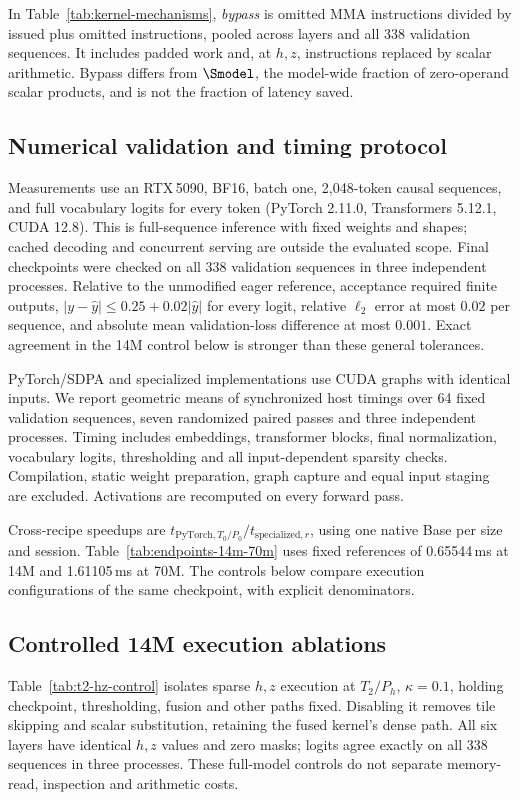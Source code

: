 In Table~\ref{tab:kernel-mechanisms}, \emph{bypass} is omitted MMA instructions divided by issued plus omitted instructions, pooled across layers and all 338 validation sequences. It includes padded work and, at $h,z$, instructions replaced by scalar arithmetic. Bypass differs from $\Smodel$, the model-wide fraction of zero-operand scalar products, and is not the fraction of latency saved.

\subsection{Numerical validation and timing protocol}
Measurements use an RTX\,5090, BF16, batch one, 2,048-token causal sequences,
and full vocabulary logits for every token (PyTorch 2.11.0, Transformers 5.12.1,
CUDA 12.8). This is full-sequence inference with fixed weights and shapes;
cached decoding and concurrent serving are outside the evaluated scope.
Final checkpoints were checked on all 338 validation sequences in three
independent processes. Relative to the unmodified eager reference, acceptance
required finite outputs, $|y-\hat y|\leq0.25+0.02|\hat y|$ for every logit,
relative $\ell_2$ error at most $0.02$ per sequence, and absolute mean
validation-loss difference at most $0.001$. Exact agreement in the 14M control
below is stronger than these general tolerances.

PyTorch/SDPA and specialized implementations use CUDA graphs with identical
inputs. We report geometric means of synchronized host timings over 64 fixed
validation sequences, seven randomized paired passes and three independent
processes. Timing includes embeddings, transformer blocks, final normalization,
vocabulary logits, thresholding and all input-dependent sparsity checks.
Compilation, static weight preparation, graph capture and equal input staging
are excluded. Activations are recomputed on every forward pass.

Cross-recipe speedups are $t_{\mathrm{PyTorch},T_0/P_0}/t_{\mathrm{specialized},r}$, using one native Base per size and session. Table~\ref{tab:endpoints-14m-70m} uses fixed references of 0.65544\,ms at 14M and 1.61105\,ms at 70M. The controls below compare execution configurations of the same checkpoint, with explicit denominators.

\subsection{Controlled 14M execution ablations}
\label{app:t2-hz-control}
Table~\ref{tab:t2-hz-control} isolates sparse $h,z$ execution at $T_2/P_h$, $\kappa=0.1$, holding checkpoint, thresholding, fusion and other paths fixed. Disabling it removes tile skipping and scalar substitution, retaining the fused kernel's dense path. All six layers have identical $h,z$ values and zero masks; logits agree exactly on all 338 sequences in three processes. These full-model controls do not separate memory-read, inspection and arithmetic costs.

